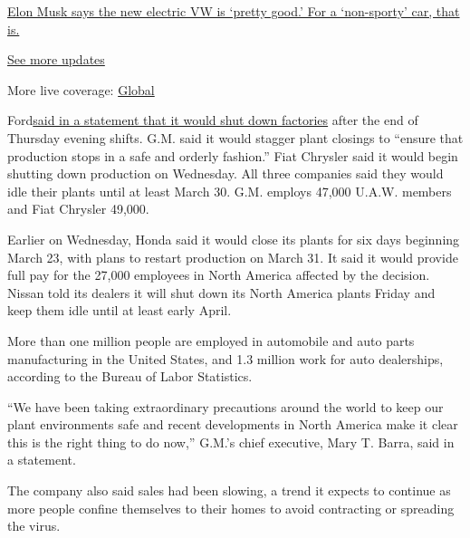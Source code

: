 \href{https://www.nytimes3xbfgragh.onion/live/2020/09/08/business/stock-market-today-coronavirus?action=click\&pgtype=Article\&state=default\&region=MAIN_CONTENT_1\&context=storylines_live_updates\#elon-musk-says-the-new-electric-vw-is-pretty-good-for-a-non-sporty-car-that-is}{Elon
Musk says the new electric VW is `pretty good.' For a `non-sporty' car,
that is.}

\href{https://www.nytimes3xbfgragh.onion/live/2020/09/08/business/stock-market-today-coronavirus?action=click\&pgtype=Article\&state=default\&region=MAIN_CONTENT_1\&context=storylines_live_updates}{See
more updates}

More live coverage:
\href{https://www.nytimes3xbfgragh.onion/2020/09/08/world/covid-19-coronavirus.html?action=click\&pgtype=Article\&state=default\&region=MAIN_CONTENT_1\&context=storylines_live_updates}{Global}

Ford\href{https://media.ford.com/content/fordmedia/fna/us/en/news/2020/03/18/ford-reduces-north-america-production-to-help-keep-workforce-saf.html}{said
in a statement that it would shut down factories} after the end of
Thursday evening shifts. G.M. said it would stagger plant closings to
``ensure that production stops in a safe and orderly fashion.'' Fiat
Chrysler said it would begin shutting down production on Wednesday. All
three companies said they would idle their plants until at least March
30. G.M. employs 47,000 U.A.W. members and Fiat Chrysler 49,000.

Earlier on Wednesday, Honda said it would close its plants for six days
beginning March 23, with plans to restart production on March 31. It
said it would provide full pay for the 27,000 employees in North America
affected by the decision. Nissan told its dealers it will shut down its
North America plants Friday and keep them idle until at least early
April.

More than one million people are employed in automobile and auto parts
manufacturing in the United States, and 1.3 million work for auto
dealerships, according to the Bureau of Labor Statistics.

``We have been taking extraordinary precautions around the world to keep
our plant environments safe and recent developments in North America
make it clear this is the right thing to do now,'' G.M.'s chief
executive, Mary T. Barra, said in a statement.

The company also said sales had been slowing, a trend it expects to
continue as more people confine themselves to their homes to avoid
contracting or spreading the virus.

